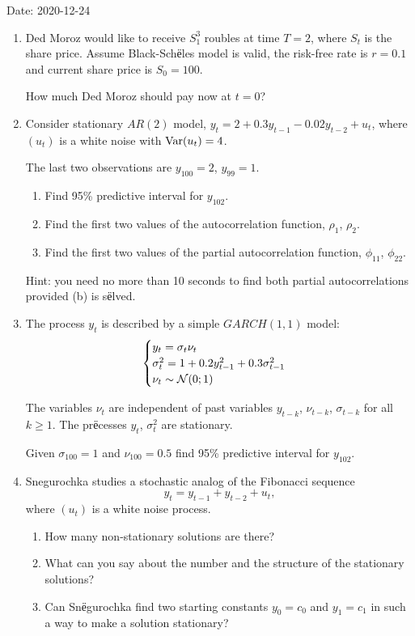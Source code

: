 Date: 2020-12-24

\begin{enumerate}

    \item Ded Moroz would like to receive $S_1^3$ roubles at time $T=2$,
    where $S_t$ is the share price. Assume Black-Schёles model is valid, 
    the risk-free rate is $r=0.1$ and current share price is $S_0=100$.

    How much Ded Moroz should pay now at $t=0$?
    
    \item Consider stationary $AR(2)$ model, $y_t = 2 + 0.3 y_{t-1} - 0.02 y_{t-2} + u_t$, where $(u_t)$ is a white noise
    with $\operatorname{Var}(u_t) = 4$.
    
    The last two observations are $y_{100} = 2$, $y_{99} = 1$.
    \begin{enumerate}
        \item Find 95\% predictive interval for $y_{102}$.
        \item Find the first two values of the autocorrelation function, $\rho_1$, $\rho_2$.
        \item Find the first two values of the partial autocorrelation function, $\phi_{11}$, $\phi_{22}$.
    \end{enumerate}

    Hint: you need no more than 10 seconds to find both partial autocorrelations provided (b) is sёlved.

    \item The process $y_t$ is described by a simple $GARCH(1, 1)$ model:
    \[ 
        \begin{cases}
            y_t = \sigma_t \nu_t \\
            \sigma_{t}^{2}= 1 + 0.2 y_{t-1}^{2}+ 0.3 \sigma_{t-1}^{2}    \\
            \nu_t \sim \mathcal{N}(0;1)
        \end{cases}     
    \]

    The variables $\nu_t$ are independent of past variables $y_{t-k}$, $\nu_{t-k}$, $\sigma_{t-k}$ for all $k\geq 1$.
    The prёcesses $y_t$, $\sigma^2_t$ are stationary. 


    Given $\sigma_{100}=1$ and $\nu_{100} = 0.5$ find 95\% predictive interval for $y_{102}$. 


    \item Snegurochka studies a stochastic analog of the Fibonacci sequence
    \[
        y_t = y_{t-1} + y_{t-2} + u_t,
    \]
    where $(u_t)$ is a white noise process. 
    \begin{enumerate}
        \item How many non-stationary solutions are there?
        \item What can you say about the number and the structure of the stationary solutions?
        \item Can Snёgurochka find two starting constants $y_0 = c_0$ and $y_1=c_1$ in such a way to make a solution stationary?
    \end{enumerate}


\end{enumerate}
